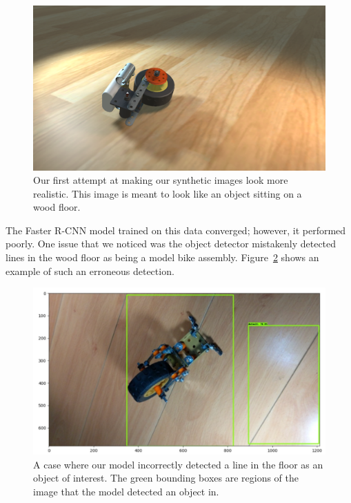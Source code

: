 \begin{figure}
  \includegraphics[width=\columnwidth]{figures/synthetic/wood_floor.png}
  \caption{
    Our first attempt at making our synthetic images look more realistic.
    This image is meant to look like an object sitting on a wood floor.
  }\label{fig:wood_floor}
\end{figure}

The Faster R-CNN model trained on this data converged; however, it performed
poorly.
One issue that we noticed was the object detector mistakenly detected lines
in the wood floor as being a model bike assembly.
Figure~\ref{fig:false_positive} shows an example of such an erroneous detection.

\begin{figure}
  \includegraphics[width=\columnwidth]{figures/synthetic/false_positive.png}
  \caption{
    A case where our model incorrectly detected a line in the floor as an
    object of interest.
    The green bounding boxes are regions of the image that the model detected
    an object in.
  }\label{fig:false_positive}
\end{figure}

